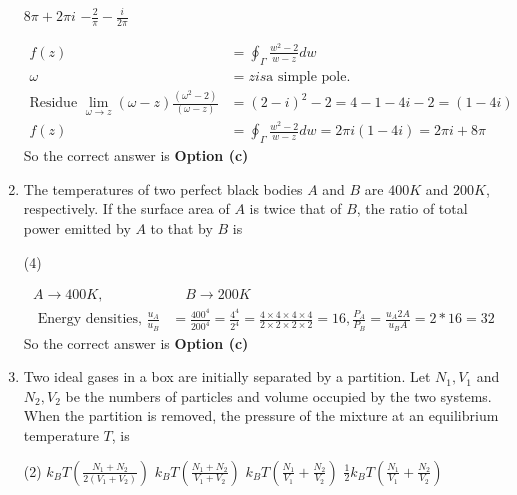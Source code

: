 \begin{enumerate}
\begin{tasks}
	\task[\textbf{c.}]$8 \pi+2 \pi i$
	\task[\textbf{d.}]$-\frac{2}{\pi}-\frac{i}{2 \pi}$ 
\end{tasks}	
\begin{answer}
	\begin{align*}
	 f(z)&=\oint_{\Gamma} \frac{w^{2}-2}{w-z} d w \\
	 \omega&=z is \text{a simple pole.}\\
	\text{Residue }\lim _{\omega \rightarrow z}(\omega-z) \frac{\left(\omega^{2}-2\right)}{(\omega-z)}&=(2-i)^{2}-2=4-1-4 i-2=(1-4 i)\\
	f(z)&=\oint_{\Gamma} \frac{w^{2}-2}{w-z} d w=2 \pi i(1-4 i)=2 \pi i+8 \pi
	\end{align*}
	So the correct answer is \textbf{Option (c)}
\end{answer}
\item  The temperatures of two perfect black bodies $A$ and $B$ are $400 K$ and $200 K$, respectively. If the surface area of $A$ is twice that of $B$, the ratio of total power emitted by $A$ to that by $B$ is
 \begin{tasks}(4)
\end{tasks}
\begin{answer}
	\begin{align*}
	A \rightarrow 400 K, &\quad B \rightarrow 200 K\\
	\text { Energy densities, } \frac{u_{A}}{u_{B}}&=\frac{400^{4}}{200^{4}}=\frac{4^{4}}{2^{4}}=\frac{4 \times 4 \times 4 \times 4}{2 \times 2 \times 2 \times 2}=16, \frac{P_{A}}{P_{B}}=\frac{u_{A} 2 A}{u_{B} A}=2 * 16=32
	\end{align*}
	So the correct answer is \textbf{Option (c)}
\end{answer}
\item Two ideal gases in a box are initially separated by a partition. Let $N_{1}, V_{1}$ and $N_{2}, V_{2}$ be the numbers of particles and volume occupied by the two systems. When the partition is removed, the pressure of the mixture at an equilibrium temperature $T$, is
 \begin{tasks}(2)
	\task[\textbf{a.}]$k_{B} T\left(\frac{N_{1}+N_{2}}{2\left(V_{1}+V_{2}\right)}\right)$
	\task[\textbf{b.}]$k_{B} T\left(\frac{N_{1}+N_{2}}{V_{1}+V_{2}}\right)$
	\task[\textbf{c.}]$k_{B} T\left(\frac{N_{1}}{V_{1}}+\frac{N_{2}}{V_{2}}\right)$
	\task[\textbf{d.}] $\frac{1}{2} k_{B} T\left(\frac{N_{1}}{V_{1}}+\frac{N_{2}}{V_{2}}\right)$
\end{tasks}

\end{enumerate}
